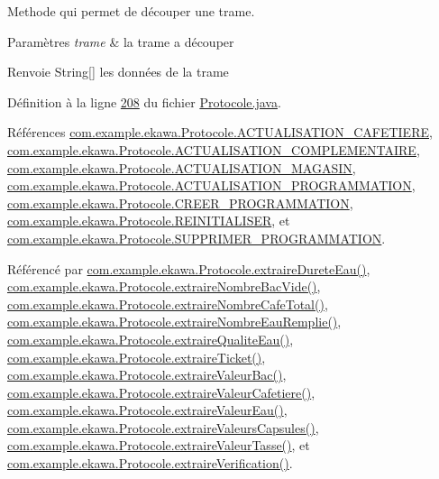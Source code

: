Methode qui permet de découper une trame. 


\begin{DoxyParams}{Paramètres}
{\em trame} & la trame a découper \\
\hline
\end{DoxyParams}
\begin{DoxyReturn}{Renvoie}
String\mbox{[}\mbox{]} les données de la trame 
\end{DoxyReturn}


Définition à la ligne \hyperlink{_protocole_8java_source_l00208}{208} du fichier \hyperlink{_protocole_8java_source}{Protocole.\+java}.



Références \hyperlink{_protocole_8java_source_l00034}{com.\+example.\+ekawa.\+Protocole.\+A\+C\+T\+U\+A\+L\+I\+S\+A\+T\+I\+O\+N\+\_\+\+C\+A\+F\+E\+T\+I\+E\+RE}, \hyperlink{_protocole_8java_source_l00036}{com.\+example.\+ekawa.\+Protocole.\+A\+C\+T\+U\+A\+L\+I\+S\+A\+T\+I\+O\+N\+\_\+\+C\+O\+M\+P\+L\+E\+M\+E\+N\+T\+A\+I\+RE}, \hyperlink{_protocole_8java_source_l00035}{com.\+example.\+ekawa.\+Protocole.\+A\+C\+T\+U\+A\+L\+I\+S\+A\+T\+I\+O\+N\+\_\+\+M\+A\+G\+A\+S\+IN}, \hyperlink{_protocole_8java_source_l00037}{com.\+example.\+ekawa.\+Protocole.\+A\+C\+T\+U\+A\+L\+I\+S\+A\+T\+I\+O\+N\+\_\+\+P\+R\+O\+G\+R\+A\+M\+M\+A\+T\+I\+ON}, \hyperlink{_protocole_8java_source_l00032}{com.\+example.\+ekawa.\+Protocole.\+C\+R\+E\+E\+R\+\_\+\+P\+R\+O\+G\+R\+A\+M\+M\+A\+T\+I\+ON}, \hyperlink{_protocole_8java_source_l00031}{com.\+example.\+ekawa.\+Protocole.\+R\+E\+I\+N\+I\+T\+I\+A\+L\+I\+S\+ER}, et \hyperlink{_protocole_8java_source_l00033}{com.\+example.\+ekawa.\+Protocole.\+S\+U\+P\+P\+R\+I\+M\+E\+R\+\_\+\+P\+R\+O\+G\+R\+A\+M\+M\+A\+T\+I\+ON}.



Référencé par \hyperlink{_protocole_8java_source_l00394}{com.\+example.\+ekawa.\+Protocole.\+extraire\+Durete\+Eau()}, \hyperlink{_protocole_8java_source_l00360}{com.\+example.\+ekawa.\+Protocole.\+extraire\+Nombre\+Bac\+Vide()}, \hyperlink{_protocole_8java_source_l00343}{com.\+example.\+ekawa.\+Protocole.\+extraire\+Nombre\+Cafe\+Total()}, \hyperlink{_protocole_8java_source_l00377}{com.\+example.\+ekawa.\+Protocole.\+extraire\+Nombre\+Eau\+Remplie()}, \hyperlink{_protocole_8java_source_l00411}{com.\+example.\+ekawa.\+Protocole.\+extraire\+Qualite\+Eau()}, \hyperlink{_protocole_8java_source_l00423}{com.\+example.\+ekawa.\+Protocole.\+extraire\+Ticket()}, \hyperlink{_protocole_8java_source_l00277}{com.\+example.\+ekawa.\+Protocole.\+extraire\+Valeur\+Bac()}, \hyperlink{_protocole_8java_source_l00233}{com.\+example.\+ekawa.\+Protocole.\+extraire\+Valeur\+Cafetiere()}, \hyperlink{_protocole_8java_source_l00299}{com.\+example.\+ekawa.\+Protocole.\+extraire\+Valeur\+Eau()}, \hyperlink{_protocole_8java_source_l00319}{com.\+example.\+ekawa.\+Protocole.\+extraire\+Valeurs\+Capsules()}, \hyperlink{_protocole_8java_source_l00255}{com.\+example.\+ekawa.\+Protocole.\+extraire\+Valeur\+Tasse()}, et \hyperlink{_protocole_8java_source_l00440}{com.\+example.\+ekawa.\+Protocole.\+extraire\+Verification()}.


